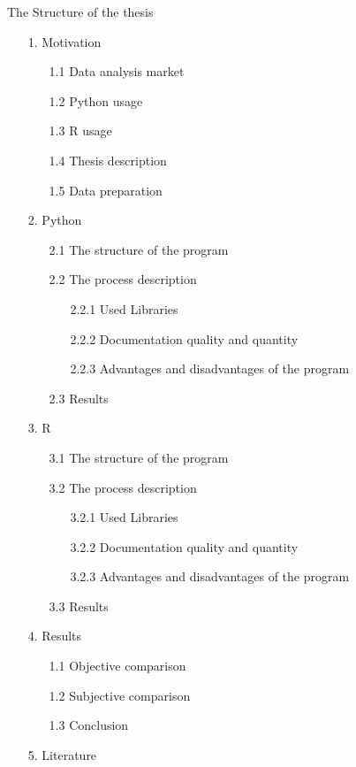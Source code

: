 \documentclass [twoside,
  11pt, a4paper,
  footinclude=true,
  headinclude=true,
  cleardoublepage=empty
]{article}
\begin{document}
The Structure of the thesis
\begin{enumerate}
    \item[1.] Motivation
        \begin{enumerate}
            \item[1.1] Data analysis market
            \item[1.2] Python usage 
            \item[1.3] R usage
            \item[1.4] Thesis description
            \item[1.5] Data preparation 
        \end{enumerate}
    \item[2.] Python
        \begin{enumerate}
            \item[2.1] The structure of the program
            \item[2.2] The process description
            \begin{enumerate}
                \item[2.2.1] Used Libraries
                \item[2.2.2] Documentation quality and quantity
                \item[2.2.3] Advantages and disadvantages of the program 
            \end{enumerate}
            \item[2.3] Results
        \end{enumerate}
    \item[3.] R
        \begin{enumerate}
            \item[3.1] The structure of the program
            \item[3.2] The process description
            \begin{enumerate}
                \item[3.2.1] Used Libraries
                \item[3.2.2] Documentation quality and quantity
                \item[3.2.3] Advantages and disadvantages of the program 
            \end{enumerate}
            \item[3.3] Results
        \end{enumerate}
    \item[4.] Results
        \begin{enumerate}
            \item[1.1] Objective comparison
            \item[1.2] Subjective comparison
            \item[1.3] Conclusion
        \end{enumerate}
    \item[5.] Literature
\end{enumerate}
\end{document}
